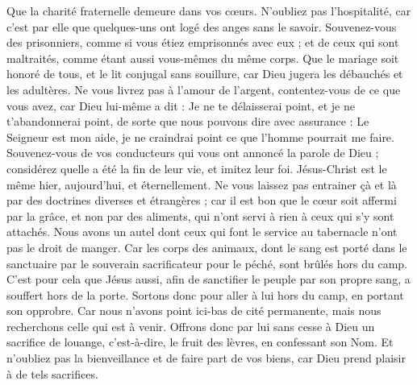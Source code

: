 \begin{multicols}{2}
\VerseOne{}Que la charité fraternelle demeure dans vos cœurs.
N'oubliez pas l'hospitalité, car c’est par elle que quelques-uns ont logé des anges sans le savoir.
Souvenez-vous des prisonniers, comme si vous étiez emprisonnés avec eux ; et de ceux qui sont maltraités, comme étant aussi vous-mêmes du même corps.
Que le mariage soit honoré de tous, et le lit conjugal sans souillure, car Dieu jugera les débauchés et les adultères.
Ne vous livrez pas à l’amour de l’argent, contentez-vous de ce que vous avez, car Dieu lui-même a dit : Je ne te délaisserai point, et je ne t'abandonnerai point,
de sorte que nous pouvons dire avec assurance : Le Seigneur est mon aide, je ne craindrai point ce que l'homme pourrait me faire.
Souvenez-vous de vos conducteurs qui vous ont annoncé la parole de Dieu ; considérez quelle a été la fin de leur vie, et imitez leur foi.
Jésus-Christ est le même hier, aujourd'hui, et éternellement.
Ne vous laissez pas entrainer çà et là par des doctrines diverses et étrangères ; car il est bon que le cœur soit affermi par la grâce, et non par des aliments, qui n'ont servi à rien à ceux qui s'y sont attachés.
Nous avons un autel dont ceux qui font le service au tabernacle n'ont pas le droit de manger.
Car les corps des animaux, dont le sang est porté dans le sanctuaire par le souverain sacrificateur pour le péché, sont brûlés hors du camp.
C'est pour cela que Jésus aussi, afin de sanctifier le peuple par son propre sang, a souffert hors de la porte.
Sortons donc pour aller à lui hors du camp, en portant son opprobre.
Car nous n'avons point ici-bas de cité permanente, mais nous recherchons celle qui est à venir.
Offrons donc par lui sans cesse à Dieu un sacrifice de louange, c'est-à-dire, le fruit des lèvres, en confessant son Nom.
Et n'oubliez pas la bienveillance et de faire part de vos biens, car Dieu prend plaisir à de tels sacrifices.

\end{multicols}
